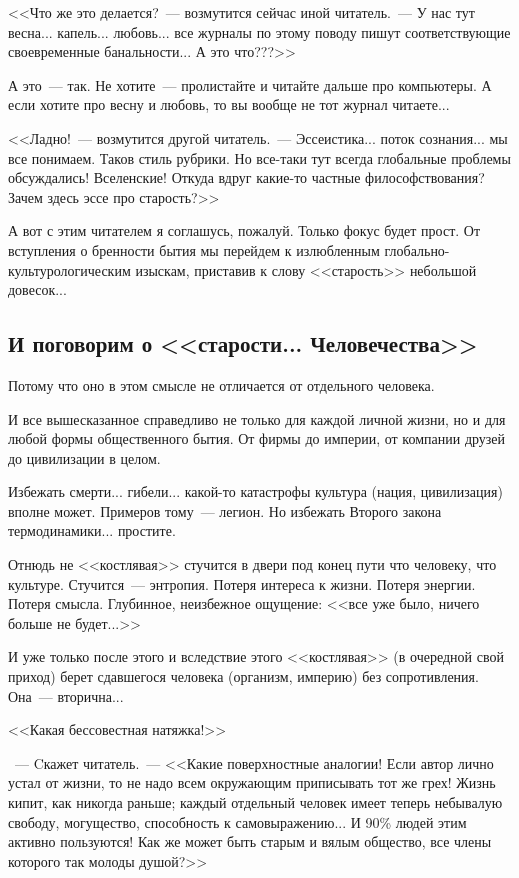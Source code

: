 \documentclass{scrbook}
\newcommand{\flqq}{<<}
\newcommand{\frqq}{>>}
\newcommand{\mdash}{~--- }
\newcommand{\essaysection}[1]{\subsection*{#1}\nopagebreak}
\begin{document}
{\flqq}Что же это делается?{\mdash}возмутится сейчас иной читатель.{\mdash}У нас тут весна... капель... любовь... все журналы по этому поводу пишут соответствующие своевременные банальности... А это что???{\frqq}

А это{\mdash}так. Не хотите{\mdash}пролистайте и читайте дальше про компьютеры. А если хотите про весну и любовь, то вы вообще не тот журнал читаете...

{\flqq}Ладно!{\mdash}возмутится другой читатель.{\mdash}Эссеистика... поток сознания... мы все понимаем. Таков стиль рубрики. Но все-таки тут всегда глобальные проблемы обсуждались! Вселенские! Откуда вдруг какие-то частные философствования? Зачем здесь эссе про старость?{\frqq}

А вот с этим читателем я соглашусь, пожалуй. Только фокус будет прост. От вступления о бренности бытия мы перейдем к излюбленным глобально-культурологическим изыскам, приставив к слову {\flqq}старость{\frqq} небольшой довесок...

\essaysection{И поговорим о {\flqq}старости... Человечества{\frqq}}

Потому что оно в этом смысле не отличается от отдельного человека.

И все вышесказанное справедливо не только для каждой личной жизни, но и для любой формы общественного бытия. От фирмы до империи, от компании друзей до цивилизации в целом.

Избежать смерти... гибели... какой-то катастрофы культура (нация, цивилизация) вполне может. Примеров тому{\mdash}легион. Но избежать Второго закона термодинамики... простите.

Отнюдь не {\flqq}костлявая{\frqq} стучится в двери под конец пути что человеку, что культуре. Стучится{\mdash}энтропия. Потеря интереса к жизни. Потеря энергии. Потеря смысла. Глубинное, неизбежное ощущение: {\flqq}все уже было, ничего больше не будет...{\frqq}

И уже только после этого и вследствие этого {\flqq}костлявая{\frqq} (в очередной свой приход) берет сдавшегося человека (организм, империю) без сопротивления. Она{\mdash}вторична...

{\flqq}Какая бессовестная натяжка!{\frqq}

{\mdash} Cкажет читатель.{\mdash}{\flqq}Какие поверхностные аналогии! Если автор лично устал от жизни, то не надо всем окружающим приписывать тот же грех! Жизнь кипит, как никогда раньше; каждый отдельный человек имеет теперь небывалую свободу, могущество, способность к самовыражению... И 90\% людей этим активно пользуются! Как же может быть старым и вялым общество, все члены которого так молоды душой?{\frqq}
\end{document}
